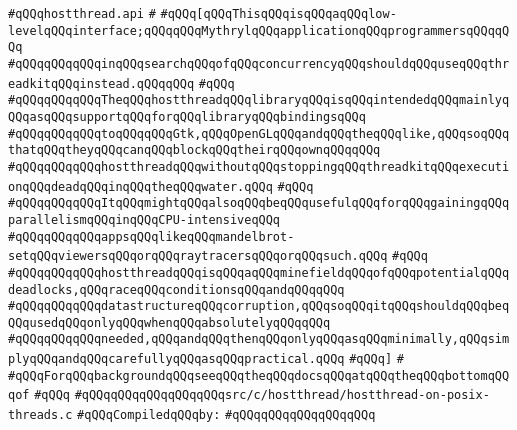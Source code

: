 \label{src/lib/std/src/hostthread.api}
\verb|#qQQqhostthread.api|\newline
\verb|#|\newline
\verb|#qQQq[qQQqThisqQQqisqQQqaqQQqlow-levelqQQqinterface;qQQqqQQqMythrylqQQqapplicationqQQqprogrammersqQQqqQQq|\newline
\verb|#qQQqqQQqqQQqinqQQqsearchqQQqofqQQqconcurrencyqQQqshouldqQQquseqQQqthreadkitqQQqinstead.qQQqqQQq|\newline
\verb|#qQQq|\newline
\verb|#qQQqqQQqqQQqTheqQQqhostthreadqQQqlibraryqQQqisqQQqintendedqQQqmainlyqQQqasqQQqsupportqQQqforqQQqlibraryqQQqbindingsqQQq|\newline
\verb|#qQQqqQQqqQQqtoqQQqqQQqGtk,qQQqOpenGLqQQqandqQQqtheqQQqlike,qQQqsoqQQqthatqQQqtheyqQQqcanqQQqblockqQQqtheirqQQqownqQQqqQQq|\newline
\verb|#qQQqqQQqqQQqhostthreadqQQqwithoutqQQqstoppingqQQqthreadkitqQQqexecutionqQQqdeadqQQqinqQQqtheqQQqwater.qQQq|\newline
\verb|#qQQq|\newline
\verb|#qQQqqQQqqQQqItqQQqmightqQQqalsoqQQqbeqQQqusefulqQQqforqQQqgainingqQQqparallelismqQQqinqQQqCPU-intensiveqQQq|\newline
\verb|#qQQqqQQqqQQqappsqQQqlikeqQQqmandelbrot-setqQQqviewersqQQqorqQQqraytracersqQQqorqQQqsuch.qQQq|\newline
\verb|#qQQq|\newline
\verb|#qQQqqQQqqQQqhostthreadqQQqisqQQqaqQQqminefieldqQQqofqQQqpotentialqQQqdeadlocks,qQQqraceqQQqconditionsqQQqandqQQqqQQq|\newline
\verb|#qQQqqQQqqQQqdatastructureqQQqcorruption,qQQqsoqQQqitqQQqshouldqQQqbeqQQqusedqQQqonlyqQQqwhenqQQqabsolutelyqQQqqQQq|\newline
\verb|#qQQqqQQqqQQqneeded,qQQqandqQQqthenqQQqonlyqQQqasqQQqminimally,qQQqsimplyqQQqandqQQqcarefullyqQQqasqQQqpractical.qQQq|\newline
\verb|#qQQq]|\newline
\verb|#|\newline
\verb|#qQQqForqQQqbackgroundqQQqseeqQQqtheqQQqdocsqQQqatqQQqtheqQQqbottomqQQqof|\newline
\verb|#qQQq|\newline
\verb|#qQQqqQQqqQQqqQQqqQQqsrc/c/hostthread/hostthread-on-posix-threads.c|\newline
\newline
\verb|#qQQqCompiledqQQqby:|\newline
\verb|#qQQqqQQqqQQqqQQqqQQq|\newline
